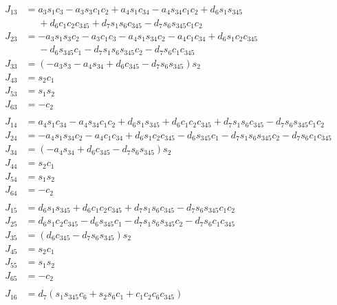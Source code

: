 \documentclass{article}
\begin{document}
\begin{align*}
J_{13} &= a_{3} s_{1} c_{3} - a_{3} s_{3} c_{1} c_{2} + a_{4} s_{1} c_{34} - a_{4} s_{34} c_{1} c_{2} + d_{6} s_{1} s_{345} \\
       &\phantom{= }+ d_{6} c_{1} c_{2} c_{345} + d_{7} s_{1} s_{6} c_{345} - d_{7} s_{6} s_{345} c_{1} c_{2} \\
J_{23} &= - a_{3} s_{1} s_{3} c_{2} - a_{3} c_{1} c_{3} - a_{4} s_{1} s_{34} c_{2} - a_{4} c_{1} c_{34} + d_{6} s_{1} c_{2} c_{345} \\
       &\phantom{= }- d_{6} s_{345} c_{1} - d_{7} s_{1} s_{6} s_{345} c_{2} - d_{7} s_{6} c_{1} c_{345} \\
J_{33} &= \left(- a_{3} s_{3} - a_{4} s_{34} + d_{6} c_{345} - d_{7} s_{6} s_{345}\right) s_{2} \\
J_{43} &= s_{2} c_{1} \\
J_{53} &= s_{1} s_{2} \\
J_{63} &= - c_{2} \\
\\
J_{14} &= a_{4} s_{1} c_{34} - a_{4} s_{34} c_{1} c_{2} + d_{6} s_{1} s_{345} + d_{6} c_{1} c_{2} c_{345} + d_{7} s_{1} s_{6} c_{345} - d_{7} s_{6} s_{345} c_{1} c_{2} \\
J_{24} &= - a_{4} s_{1} s_{34} c_{2} - a_{4} c_{1} c_{34} + d_{6} s_{1} c_{2} c_{345} - d_{6} s_{345} c_{1} - d_{7} s_{1} s_{6} s_{345} c_{2} - d_{7} s_{6} c_{1} c_{345} \\
J_{34} &= \left(- a_{4} s_{34} + d_{6} c_{345} - d_{7} s_{6} s_{345}\right) s_{2} \\
J_{44} &= s_{2} c_{1} \\
J_{54} &= s_{1} s_{2} \\
J_{64} &= - c_{2} \\
\\
J_{15} &= d_{6} s_{1} s_{345} + d_{6} c_{1} c_{2} c_{345} + d_{7} s_{1} s_{6} c_{345} - d_{7} s_{6} s_{345} c_{1} c_{2} \\
J_{25} &= d_{6} s_{1} c_{2} c_{345} - d_{6} s_{345} c_{1} - d_{7} s_{1} s_{6} s_{345} c_{2} - d_{7} s_{6} c_{1} c_{345} \\
J_{35} &= \left(d_{6} c_{345} - d_{7} s_{6} s_{345}\right) s_{2} \\
J_{45} &= s_{2} c_{1} \\
J_{55} &= s_{1} s_{2} \\
J_{65} &= - c_{2} \\
\\
J_{16} &= d_{7} \left(s_{1} s_{345} c_{6} + s_{2} s_{6} c_{1} + c_{1} c_{2} c_{6} c_{345}\right) \\

\end{align*}
\end{document}
